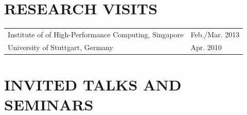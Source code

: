 \documentclass[paper=letter,fontsize=11pt]{scrartcl} %
\newcommand{\NewPart}[2]{\section*{\uppercase{#1} #2}}
\begin{document}
\NewPart{Research Visits}{}

  \begin{tabular}{p{12cm}l}
    Institute of of High-Performance Computing, Singapore & Feb./Mar. 2013 \\
    University of Stuttgart, Germany & Apr. 2010 \\
  \end{tabular}

%
%

\NewPart{Invited Talks and Seminars}{}
\end{document}
